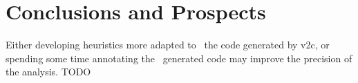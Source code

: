 \section{Conclusions and Prospects}\label{sec:concl}
%
Either developing heuristics more adapted to  
the code generated by v2c, or spending some time annotating the  
generated code may improve the precision of the analysis. TODO
